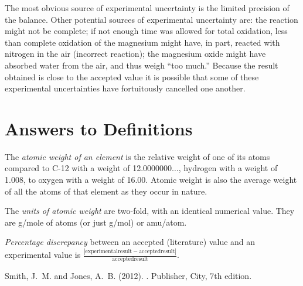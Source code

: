 \documentclass{article}
\begin{document}
The most obvious source of experimental uncertainty is the limited precision of the balance. Other potential sources of experimental uncertainty are: the reaction might not be complete; if not enough time was allowed for total oxidation, less than complete oxidation of the magnesium might have, in part, reacted with nitrogen in the air (incorrect reaction); the magnesium oxide might have absorbed water from the air, and thus weigh ``too much.'' Because the result obtained is close to the accepted value it is possible that some of these experimental uncertainties have fortuitously cancelled one another.


\section{Answers to Definitions}

\begin{enumerate}
\begin{item}
The \emph{atomic weight of an element} is the relative weight of one of its atoms compared to C-12 with a weight of 12.0000000$\ldots$, hydrogen with a weight of 1.008, to oxygen with a weight of 16.00. Atomic weight is also the average weight of all the atoms of that element as they occur in nature.
\end{item}
\begin{item}
The \emph{units of atomic weight} are two-fold, with an identical numerical value. They are g/mole of atoms (or just g/mol) or amu/atom.
\end{item}
\begin{item}
\emph{Percentage discrepancy} between an accepted (literature) value and an experimental value is $\frac{|\mathrm{experimental result} - \mathrm{accepted result}|}{\mathrm{accepted result}}$.
\end{item}
\end{enumerate}


\begin{thebibliography}{9}

Smith, J.~M. and Jones, A.~B. (2012).
.
\newblock Publisher, City, 7th edition.

\end{thebibliography}
\end{document}
